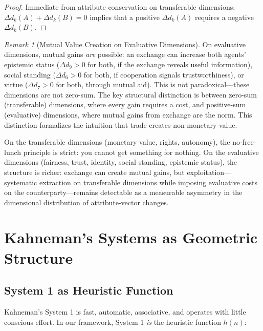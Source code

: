 \documentclass[12pt]{article}
\theoremstyle{definition}
\theoremstyle{remark}
\newtheorem{remark}[theorem]{Remark}
\begin{document}
\begin{proof}
Immediate from attribute conservation on transferable dimensions: $\Delta d_k(A) + \Delta d_k(B) = 0$ implies that a positive $\Delta d_k(A)$ requires a negative $\Delta d_k(B)$.
\end{proof}

\begin{remark}[Mutual Value Creation on Evaluative Dimensions]
On evaluative dimensions, mutual gains \emph{are} possible: an exchange can increase both agents' epistemic status ($\Delta d_9 > 0$ for both, if the exchange reveals useful information), social standing ($\Delta d_6 > 0$ for both, if cooperation signals trustworthiness), or virtue ($\Delta d_7 > 0$ for both, through mutual aid).  This is not paradoxical---these dimensions are not zero-sum.  The key structural distinction is between zero-sum (transferable) dimensions, where every gain requires a cost, and positive-sum (evaluative) dimensions, where mutual gains from exchange are the norm.  This distinction formalizes the intuition that trade creates non-monetary value.
\end{remark}

On the transferable dimensions (monetary value, rights, autonomy), the no-free-lunch principle is strict: you cannot get something for nothing.  On the evaluative dimensions (fairness, trust, identity, social standing, epistemic status), the structure is richer: exchange can create mutual gains, but exploitation---systematic extraction on transferable dimensions while imposing evaluative costs on the counterparty---remains detectable as a measurable asymmetry in the dimensional distribution of attribute-vector changes.


\section{Kahneman's Systems as Geometric Structure}
\label{sec:kahneman}

\subsection{System 1 as Heuristic Function}

Kahneman's System 1 \cite{kahneman2011} is fast, automatic, associative, and operates with little conscious effort.  In our framework, System 1 \emph{is} the heuristic function $h(n)$:
\end{document}
